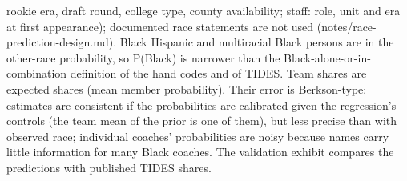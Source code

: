 {rookie era, draft round, college type, county availability; staff: role, unit and era at first appearance); documented race statements are not used (notes/race-prediction-design.md). Black Hispanic and multiracial Black persons are in the other-race probability, so P(Black) is narrower than the Black-alone-or-in-combination definition of the hand codes and of TIDES. Team shares are expected shares (mean member probability). Their error is Berkson-type: estimates are consistent if the probabilities are calibrated given the regression's controls (the team mean of the prior is one of them), but less precise than with observed race; individual coaches' probabilities are noisy because names carry little information for many Black coaches. The validation exhibit compares the predictions with published TIDES shares.
\par}

